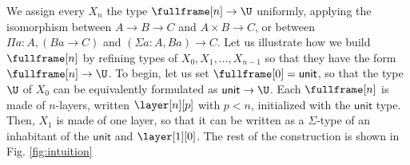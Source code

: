 \documentclass[10pt]{art.cls/art}
\newcommand{\unittype}{\ensuremath{\mathsf{unit}}}
\begin{document}
We assign every $X_n$ the type $\fullframe[n] \rightarrow \U$ uniformly, applying the isomorphism between $A \rightarrow B \rightarrow C$ and $A \times B \rightarrow C$, or between $\Pi a : A, (B a \rightarrow C)$ and $(\Sigma a : A, B a) \rightarrow C$. Let us illustrate how we build $\fullframe[n]$ by refining types of $X_0, X_1, \ldots, X_{n - 1}$ so that they have the form $\fullframe[n] \rightarrow \U$. To begin, let us set $\fullframe[0] = \unittype$, so that the type $\U$ of $X_0$ can be equivalently formulated as $\unittype \rightarrow \U$. Each $\fullframe[n]$ is made of $n$-layers, written $\layer[n][p]$ with $p < n$, initialized with the $\unittype$ type. Then, $X_1$ is made of one layer, so that it can be written as a $\Sigma$-type of an inhabitant of the $\unittype$ and $\layer[1][0]$. The rest of the construction is shown in Fig. \ref{fig:intuition}
\end{document}
